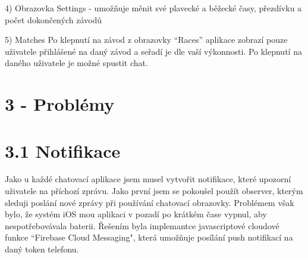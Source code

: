 \documentclass{article}
\begin{document}
4) Obrazovka Settings - umožňuje měnit své plavecké a běžecké časy, přezdívku a počet dokončených závodů
\vspace{10 mm}




















5) Matches
Po klepnutí na závod z obrazovky “Races” aplikace zobrazí pouze uživatele přihlášené na daný závod a seřadí je dle vaší výkonnosti. Po klepnutí na daného uživatele je možné spustit chat.
\vspace{10 mm}










































\section{3 - Problémy}
\vspace{10 mm}

\section{3.1 Notifikace}
\vspace{10 mm}
Jako u každé chatovací aplikace jsem musel vytvořit notifikace, které upozorní uživatele na příchozí zprávu. Jako první jsem se pokoušel použít observer, kterým sleduji poslání nové zprávy při používání chatovací obrazovky. Problémem však bylo, že systém iOS mou aplikaci v pozadí po krátkém čase vypnul, aby nespotřebovávala baterii. Řešením byla implemantce javascriptové cloudové funkce “Firebase Cloud Messaging", která umožňuje posílání push notifikací na daný token telefonu. 
\vspace{10 mm}
\end{document}
